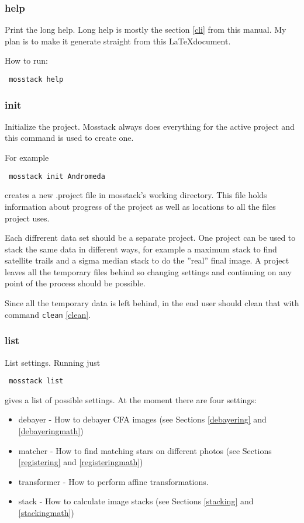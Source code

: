 \documentclass[twoside,a4paper]{refart}
\begin{document}
\subsubsection{help}
\label{help}

Print the long help. Long help is mostly the section \ref{cli} from this manual. My plan is to make it generate
straight from this \LaTeX document.

How to run: 

\begin{verbatim}
 mosstack help
\end{verbatim}



\subsubsection{init}
\label{init}

Initialize the project. Mosstack always does everything for the active project and this command is used to create
one.

For example

\begin{verbatim}
 mosstack init Andromeda
\end{verbatim}

creates a new .project file in mosstack's working directory. This file holds information about progress of the
project as well as locations to all the files project uses.

Each diffrerent data set should be a separate project. One project can be used to stack the same data in different
ways, for example a maximum stack to find satellite trails and a sigma median stack to do the ''real'' final image.
A project leaves all the temporary files behind so changing settings and continuing on any point of the process should
be possible.

Since all the temporary data is left behind, in the end user should clean that with command \texttt{clean} \ref{clean}.

\subsubsection{list}
\label{list}
List settings. Running just

\begin{verbatim}
 mosstack list
\end{verbatim}

gives a list of possible settings. At the moment there are four settings:
\begin{itemize}
 \item debayer - How to debayer CFA images (see Sections \ref{debayering} and \ref{debayeringmath})
 \item matcher - How to find matching stars on different photos (see Sections \ref{registering} and \ref{registeringmath})
 \item transformer - How to perform affine transformations.
 \item stack - How to calculate image stacks (see Sections \ref{stacking} and \ref{stackingmath})
\end{itemize}
\end{document}
